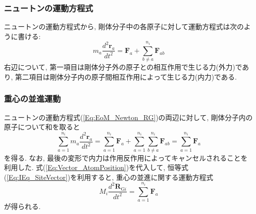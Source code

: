 \subsubsection{ニュートンの運動方程式}

ニュートンの運動方程式から, 剛体分子中の各原子に対して運動方程式は次のように書ける:
\begin{equation}
  m_{a} \frac{d^{2} \bm{r}_{a}}{dt^{2}}
  =
  \bm{F}_{a} + \sum_{b \neq a}^{n_{i}} \bm{F}_{ab}
  \label{Eq:EoM_Newton_RG}
\end{equation}
右辺について, 第一項目は剛体分子外の原子との相互作用で生じる力(外力)であり, 第二項目は剛体分子内の原子間相互作用によって生じる力(内力)である. 

\subsubsection{重心の並進運動}
ニュートンの運動方程式(\ref{Eq:EoM_Newton_RG})の両辺に対して, 剛体分子内の原子について和を取ると
\begin{equation}
  \sum_{a=1}^{n_{i}} m_{a} \frac{d^{2} \bm{r}_{a}}{dt^{2}}
  =
  \sum_{a=1}^{n_{i}} \bm{F}_{a}
  +
  \sum_{a=1}^{n_{i}} \sum_{b \neq a}^{n_{i}} \bm{F}_{ab}
  =
  \sum_{a=1}^{n_{i}} \bm{F}_{a}
\end{equation}
を得る. なお, 最後の変形で内力は作用反作用によってキャンセルされることを利用した.
式(\ref{Eq:Vector_AtomPosition})を代入して, 恒等式(\ref{Eq:IEq_SiteVector})を利用すると, 重心の並進に関する運動方程式
\begin{equation}
  M_{i} \frac{d^{2} \bm{R}_{\mathrm{G}i}}{dt^{2}} = \sum_{a=1}^{n_{i}} \bm{F}_{a}
  \label{Eq:EoM_CoM_Translocate}
\end{equation}
が得られる.


